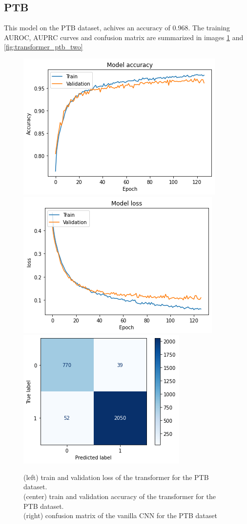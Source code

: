 \documentclass[11pt]{scrartcl}
\begin{document}
\subsection{PTB}
This model on the PTB dataset, achives an accuracy of 0.968. The training AUROC, AUPRC curves and confusion matrix  are summarized in images \ref{fig:tranformer_ptb_three} and \ref{fig:transformer_ptb_two}
\begin{figure}[htp]
\centering
\includegraphics[width=.30\textwidth]{../models_performance_graphs/ptb/transformer_ptb_accuracy.png}\hfill
\includegraphics[width=.30\textwidth]{../models_performance_graphs/ptb/transformer_ptb_loss.png}\hfill
\includegraphics[width=.30\textwidth]{../models_performance_graphs/ptb/transformer_ptb_confusion.png}
\caption{(left) train and validation loss of the transformer for the PTB dataset. \\ (center) train and validation accuracy of the transformer for the PTB dataset. \\(right) confusion matrix of the vanilla CNN for the PTB dataset}
\label{fig:tranformer_ptb_three}
\end{figure}
\end{document}
